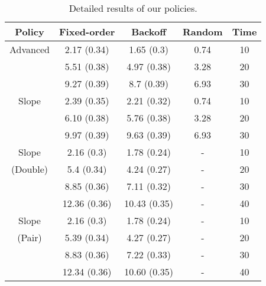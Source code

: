 \begin{table}
  \begin{center}
    \begin{tabular}{ c| c c c | c }
      Policy & Fixed-order & Backoff & Random & Time\\
      \hline 
       Advanced & 2.17 (0.34) & 1.65 (0.3) & 0.74 & 10 \\
	       & 5.51 (0.38) & 4.97 (0.38) & 3.28 & 20 \\
	       & 9.27 (0.39) & 8.7 (0.39) & 6.93 & 30 \\
      \hline 
      Slope    & 2.39 (0.35) & 2.21 (0.32) & 0.74 & 10 \\
	       & 6.10 (0.38) & 5.76 (0.38) & 3.28 & 20 \\
	       & 9.97 (0.39) & 9.63 (0.39) & 6.93 & 30 \\
      \hline   
      \hline 
      Slope    & 2.16 (0.3) & 1.78 (0.24) &-&10\\
(Double)       & 5.4 (0.34) & 4.24 (0.27) &-&20\\
	       & 8.85 (0.36) & 7.11 (0.32) &-&30\\
	       & 12.36 (0.36) & 10.43 (0.35) &-&40\\
      
      \hline 
      \hline 
      Slope    & 2.16 (0.3) & 1.78 (0.24) &-& 10\\
(Pair)         & 5.39 (0.34) & 4.27 (0.27) &-& 20\\
	       & 8.83 (0.36) & 7.22 (0.33) &-& 30\\
	       & 12.34 (0.36) & 10.60 (0.35) &-& 40\\
    \end{tabular}
    \caption{Detailed results of our policies.}
    \label{tab:scoreClassifier}
  \end{center}
\end{table}
